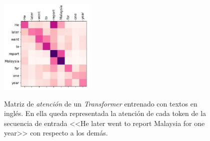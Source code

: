 \begin{figure}[H]
    \caption[Matriz de \textit{atención} de un \textit{Transformer} entrenado con textos en inglés]{Matriz de \textit{atención} de un \textit{Transformer} entrenado con textos en inglés. En ella queda representada la atención de cada token de la secuencia de entrada <<He later went to report Malaysia for one year>> con respecto a los demás.}
    \centering
    \includegraphics[width=0.4\textwidth]{./figuras/Transformer_attention_matrix.png}
    \label{fig:transformer_attention}
\end{figure}
